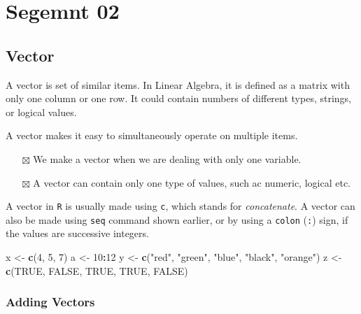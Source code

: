 \documentclass[
]{book}
\newenvironment{Shaded}{\begin{snugshade}}{\end{snugshade}}
\newcommand{\DecValTok}[1]{\textcolor[rgb]{0.00,0.00,0.81}{#1}}
\newcommand{\KeywordTok}[1]{\textcolor[rgb]{0.13,0.29,0.53}{\textbf{#1}}}
\newcommand{\NormalTok}[1]{#1}
\newcommand{\OperatorTok}[1]{\textcolor[rgb]{0.81,0.36,0.00}{\textbf{#1}}}
\newcommand{\OtherTok}[1]{\textcolor[rgb]{0.56,0.35,0.01}{#1}}
\newcommand{\StringTok}[1]{\textcolor[rgb]{0.31,0.60,0.02}{#1}}
\providecommand{\tightlist}{%
  \setlength{\itemsep}{0pt}\setlength{\parskip}{0pt}}
\begin{document}
\hypertarget{segemnt-02}{%
\section{Segemnt 02}\label{segemnt-02}}

\hypertarget{vector}{%
\subsection{Vector}\label{vector}}

A vector is set of similar items. In Linear Algebra, it is defined as a matrix with only one column or one row. It could contain numbers of different types, strings, or logical values.

A vector makes it easy to simultaneously operate on multiple items.

\begin{itemize}
\tightlist
\item[$\boxtimes$]
  We make a vector when we are dealing with only one variable.
\item[$\boxtimes$]
  A vector can contain only one type of values, such ac numeric, logical etc.
\end{itemize}

A vector in \texttt{R} is usually made using \texttt{c}, which stands for \emph{concatenate}. A vector can also be made using \texttt{seq} command shown earlier, or by using a \texttt{colon} (\texttt{:}) sign, if the values are successive integers.

\begin{Shaded}
\begin{Highlighting}[]
\NormalTok{x <-}\StringTok{ }\KeywordTok{c}\NormalTok{(}\DecValTok{4}\NormalTok{, }\DecValTok{5}\NormalTok{, }\DecValTok{7}\NormalTok{)}
\NormalTok{a <-}\StringTok{ }\DecValTok{10}\OperatorTok{:}\DecValTok{12}
\NormalTok{y <-}\StringTok{ }\KeywordTok{c}\NormalTok{(}\StringTok{"red"}\NormalTok{, }\StringTok{"green"}\NormalTok{, }\StringTok{"blue"}\NormalTok{, }\StringTok{"black"}\NormalTok{, }\StringTok{"orange"}\NormalTok{)}
\NormalTok{z <-}\StringTok{ }\KeywordTok{c}\NormalTok{(}\OtherTok{TRUE}\NormalTok{, }\OtherTok{FALSE}\NormalTok{, }\OtherTok{TRUE}\NormalTok{, }\OtherTok{TRUE}\NormalTok{, }\OtherTok{FALSE}\NormalTok{)}
\end{Highlighting}
\end{Shaded}

\hypertarget{adding-vectors}{%
\subsubsection{Adding Vectors}\label{adding-vectors}}
\end{document}
